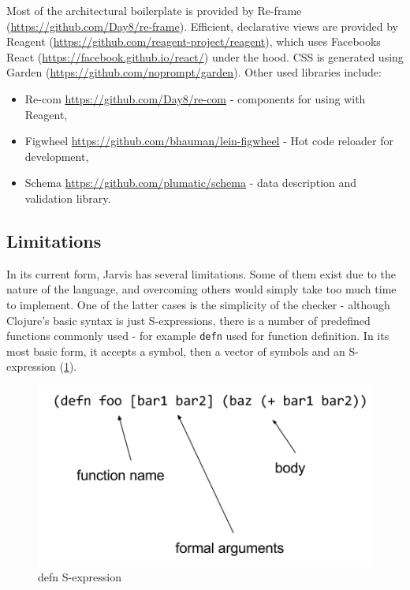 \documentclass[11pt]{scrartcl}
\begin{document}
Most of the architectural boilerplate is provided by Re-frame
(\url{https://github.com/Day8/re-frame}).
Efficient, declarative views are provided by Reagent
(\url{https://github.com/reagent-project/reagent}), which uses Facebooks React
(\url{https://facebook.github.io/react/}) under the hood.
CSS is generated using Garden (\url{https://github.com/noprompt/garden}).
Other used libraries include:
\begin{itemize}
  \item Re-com \url{https://github.com/Day8/re-com} - components for using with
    Reagent,
    
  \item Figwheel \url{https://github.com/bhauman/lein-figwheel} - Hot code
    reloader for development,
    
  \item Schema \url{https://github.com/plumatic/schema} - data description and
    validation library.
    
\end{itemize}

\subsection{Limitations}
In its current form, Jarvis has several limitations.
Some of them exist due to the nature of the language, and overcoming others
would simply take too much time to implement.
One of the latter cases is the simplicity of the checker - although Clojure’s
basic syntax is just S-expressions, there is a number of predefined functions
commonly used - for example \lstinline|defn| used for function definition.
In its most basic form, it accepts a symbol, then a vector of symbols and an
S-expression (\ref{sexp}).


\begin{figure}[hbt]
  \includegraphics[scale=0.5]{img/sexp}
  \caption{defn S-expression}
  \label{sexp}
\end{figure}
\end{document}
